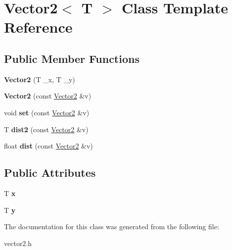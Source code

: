 \hypertarget{class_vector2}{}\section{Vector2$<$ T $>$ Class Template Reference}
\label{class_vector2}
\subsection*{Public Member Functions}
\begin{DoxyCompactItemize}
\item 
{\bfseries Vector2} (T \_x, T \_y)\hypertarget{class_vector2_a8706751917c16eb45fb601fef07f6af6}{}\label{class_vector2_a8706751917c16eb45fb601fef07f6af6}

\item 
{\bfseries Vector2} (const \hyperlink{class_vector2}{Vector2} \&v)\hypertarget{class_vector2_a2280dc236fb603c377bbce3fad872e67}{}\label{class_vector2_a2280dc236fb603c377bbce3fad872e67}

\item 
void {\bfseries set} (const \hyperlink{class_vector2}{Vector2} \&v)\hypertarget{class_vector2_a5d70f11f5901df2ddb66007fc1d5a307}{}\label{class_vector2_a5d70f11f5901df2ddb66007fc1d5a307}

\item 
T {\bfseries dist2} (const \hyperlink{class_vector2}{Vector2} \&v)\hypertarget{class_vector2_ab439fdeb8e41593d116ab8f5cf434590}{}\label{class_vector2_ab439fdeb8e41593d116ab8f5cf434590}

\item 
float {\bfseries dist} (const \hyperlink{class_vector2}{Vector2} \&v)\hypertarget{class_vector2_a8593253c767ca5f8b37f89648b8a9d6b}{}\label{class_vector2_a8593253c767ca5f8b37f89648b8a9d6b}

\end{DoxyCompactItemize}
\subsection*{Public Attributes}
\begin{DoxyCompactItemize}
\item 
T {\bfseries x}\hypertarget{class_vector2_a78fa1f2ed5e261c7fbeb8f3536a1ee34}{}\label{class_vector2_a78fa1f2ed5e261c7fbeb8f3536a1ee34}

\item 
T {\bfseries y}\hypertarget{class_vector2_a6cfed8355591aa269f4dba43bd806ef9}{}\label{class_vector2_a6cfed8355591aa269f4dba43bd806ef9}

\end{DoxyCompactItemize}


The documentation for this class was generated from the following file:\begin{DoxyCompactItemize}
\item 
vector2.h\end{DoxyCompactItemize}
